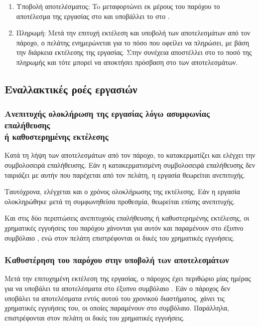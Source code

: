 \begin{enumerate}
    \item Υποβολή αποτελέσματος: To  μεταφορτώνει εκ μέρους του παρόχου το αποτέλεσμα της εργασίας στο  και υποβάλλει το  στο  \textit{}.
    \item Πληρωμή: Μετά την επιτυχή εκτέλεση και υποβολή των αποτελεσμάτων από τον πάροχο, ο πελάτης ενημερώνεται για το πόσο που οφείλει να πληρώσει, με βάση την διάρκεια εκτέλεσης της εργασίας. Στην συνέχεια αποστέλλει στο  \textit{} το ποσό της πληρωμής και τότε μπορεί να αποκτήσει πρόσβαση στο  των αποτελεσμάτων.
\end{enumerate}

\subsection{Εναλλακτικές ροές εργασιών}
\subsubsection{Ανεπιτυχής ολοκλήρωση της εργασίας λόγω ασυμφωνίας επαλήθευσης \\ή καθυστερημένης εκτέλεσης}
Κατά τη λήψη των αποτελεσμάτων από τον πάροχο, το  κατακερματίζει και ελέγχει την συμβολοσειρά επαλήθευσης.
Εάν η κατακερματισμένη συμβολοσειρά επαλήθευσης δεν ταιριάζει με αυτήν που παρέχεται από τον πελάτη, η εργασία θεωρείται ανεπιτυχής.

Ταυτόχρονα, ελέγχεται και ο χρόνος ολοκλήρωσης της εκτέλεσης. Εάν η εργασία ολοκληρώθηκε μετά τη συμφωνηθείσα προθεσμία, θεωρείται επίσης ανεπιτυχής.

Και στις δύο περιπτώσεις ανεπιτυχούς επαλήθευσης ή καθυστερημένης εκτέλεσης, οι χρηματικές εγγυήσεις του παρόχου χάνονται για αυτόν και παραμένουν στο έξυπνο συμβόλαιο , ενώ στον πελάτη επιστρέφονται οι δικές του χρηματικές εγγυήσεις.

\subsubsection{Καθυστέρηση του παρόχου στην υποβολή των αποτελεσμάτων}
Μετά την επιτυχημένη εκτέλεση της εργασίας, ο πάροχος έχει περιθώριο μίας ημέρας για να υποβάλει τα αποτελέσματα στο έξυπνο συμβόλαιο . Εάν ο πάροχος δεν υποβάλει τα αποτελέσματα εντός αυτού του χρονικού διαστήματος, χάνει τις χρηματικές εγγυήσεις του, οι οποίες παραμένουν στο συμβόλαιο. Παράλληλα, επιστρέφονται στον πελάτη οι δικές του χρηματικές εγγυήσεις.

